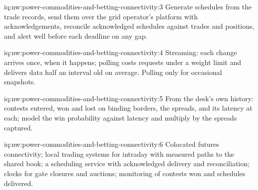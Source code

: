 \begin{solution}{iq:nw:power-commodities-and-betting-connectivity:3}
Generate schedules from the trade records, send them over the grid operator's platform with acknowledgements, reconcile acknowledged
schedules against trades and positions, and alert well before each deadline on any gap.
\end{solution}

\begin{solution}{iq:nw:power-commodities-and-betting-connectivity:4}
Streaming: each change arrives once, when it happens; polling costs requests under a weight limit and delivers data half an interval
old on average. Polling only for occasional snapshots.
\end{solution}

\begin{solution}{iq:nw:power-commodities-and-betting-connectivity:5}
From the desk's own history: contests entered, won and lost on binding borders, the spreads, and its latency at each; model the win
probability against latency and multiply by the spreads captured.
\end{solution}

\begin{solution}{iq:nw:power-commodities-and-betting-connectivity:6}
Colocated futures connectivity; local trading systems for intraday with measured paths to the shared book; a scheduling service with
acknowledged delivery and reconciliation; clocks for gate closures and auctions; monitoring of contests won and schedules delivered.
\end{solution}
